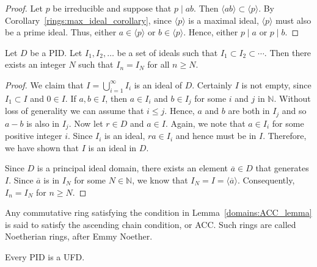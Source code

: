 \begin{proof}
Let $p$ be irreducible and suppose that $p \mid ab$.  Then $\langle
ab \rangle \subset \langle p \rangle$. By Corollary~\ref{rings:max_ideal_corollary}, since
$\langle p \rangle$ is a maximal ideal, $\langle p \rangle$ must also
be a prime ideal. Thus, either $a \in \langle p \rangle$ or $b \in
\langle p \rangle$.  Hence, either $p \mid a $ or $p \mid b$. 
\end{proof}


\begin{lemma}\label{domains:ACC_lemma}
Let $D$ be a PID.  Let $I_1, I_2, \ldots$ be a set of ideals such that 
$I_1 \subset I_2 \subset \cdots$. Then there exists an integer $N$
such that $I_n = I_N$ for all $n \geq N$.
\end{lemma}

 

\begin{proof}
We claim that $I= \bigcup_{i=1}^\infty I_i$ is an ideal of $D$. Certainly
$I$ is not empty, since $I_1 \subset I$ and $0 \in I$. If $a, b \in I$,
then $a \in I_i$ and $b \in I_j$ for some $i$ and $j$ in ${\mathbb N}$.
Without loss of generality we can assume that $i \leq j$.  Hence, $a$
and $b$ are both in $I_j$ and so $a - b$ is also in $I_j$. Now let $r
\in D$ and $a \in I$. Again, we note that $a \in I_i$ for some
positive integer $i$.  Since $I_i$ is an ideal, $ra \in I_i$ and hence
must be in $I$. Therefore, we have shown that $I$ is an ideal in $D$.



Since $D$ is a principal ideal domain, there exists an element 
$\overline{a} \in D$ that generates $I$. Since $\overline{a}$ is in 
$I_N$ for some $N \in {\mathbb N}$, we know that $I_N = I = \langle 
\overline{a} \rangle$. Consequently, $I_n = I_N$ for $n \geq N$.
\end{proof}		    
 

\medskip


Any commutative ring satisfying the condition in Lemma~\ref{domains:ACC_lemma} is said
to satisfy the {\bfi ascending chain condition}, or {\bfi ACC}.  Such rings are called {\bfi
Noetherian rings}, after Emmy Noether.  


\begin{theorem}
Every PID is a UFD.
\end{theorem}
 

